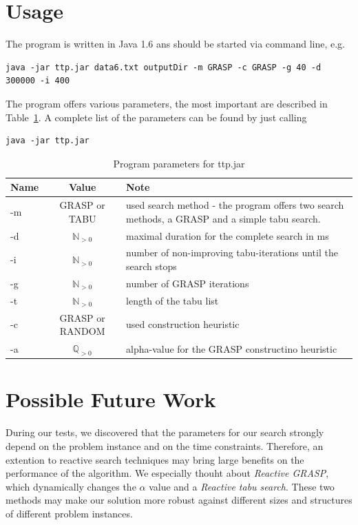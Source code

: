 \documentclass[a4paper,11pt]{article}
\begin{document}
\section{Usage}
The program is written in Java 1.6 ans should be started via command line, e.g.
\small
\lstset{language=sh}
\begin{lstlisting}
java -jar ttp.jar data6.txt outputDir -m GRASP -c GRASP -g 40 -d 300000 -i 400
\end{lstlisting}

The program offers various parameters, the most important are described in Table~\ref{tab:program}. A complete list of the parameters can be found by just calling 
\begin{lstlisting}
java -jar ttp.jar
\end{lstlisting}

\begin{center}
 \begin{table}[h!tb]
  \begin{tabularx}{\linewidth}{| l | c | X | }
    \hline                       
    Name & Value & Note \\   \hline     \hline    
    -m & GRASP or TABU & used search method - the program offers two search methods, a GRASP and a simple tabu search. \\ \hline    
    -d  & $\mathbb{N}_{ > 0}$ & maximal duration for the complete search in ms \\ \hline    
    -i & $\mathbb{N}_{ > 0}$ & number of non-improving tabu-iterations until the search stops\\ \hline    
    -g & $\mathbb{N}_{ > 0}$ & number of GRASP iterations\\ \hline  
    -t & $\mathbb{N}_{ > 0}$ & length of the tabu list \\ \hline  
    -c & GRASP or RANDOM & used construction heuristic \\ \hline  
    -a & $\mathbb{Q}_{ > 0}$ & alpha-value for the GRASP constructino heuristic \\ \hline  
  \end{tabularx}
    \caption{Program parameters for ttp.jar}
  \label{tab:program}
  \end{table}
\end{center}

\section{Possible Future Work}
During our tests, we discovered that the parameters for our search strongly depend on the problem instance and on the time constraints. Therefore,
an extention to reactive search techniques may bring large benefits on the performance of the algorithm. We especially thouht about \emph{Reactive GRASP},
 which dynamically changes the $\alpha$ value and a \emph{Reactive tabu search}. These two methods may make our solution more robust against different
sizes and structures of different problem instances.
\end{document}
